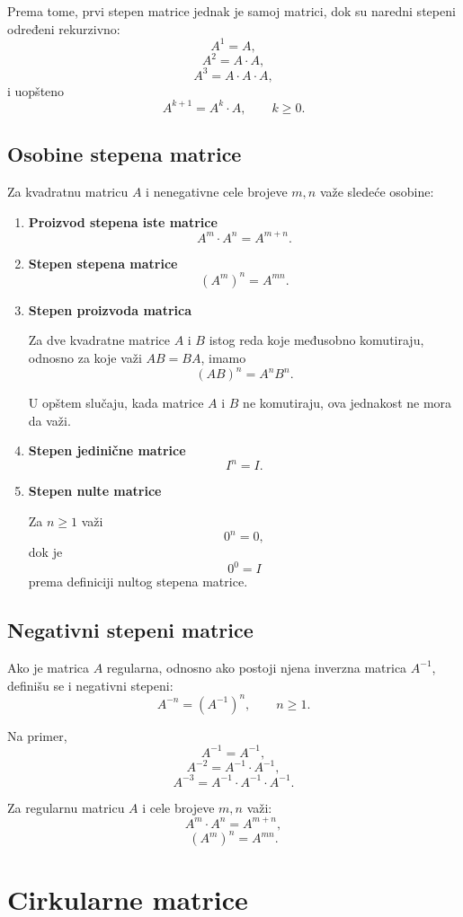 \documentclass[12pt,a4paper]{report}
\begin{document}
Prema tome, prvi stepen matrice jednak je samoj matrici,
dok su naredni stepeni određeni rekurzivno:
\[
A^1=A,
\]
\[
A^2=A\cdot A,
\]
\[
A^3=A\cdot A\cdot A,
\]
i uopšteno
\[
A^{k+1}=A^k\cdot A,\qquad k\geq 0.
\]

\subsection{Osobine stepena matrice}

Za kvadratnu matricu $A$ i nenegativne cele brojeve $m,n$
važe sledeće osobine:

\begin{enumerate}
	\item \textbf{Proizvod stepena iste matrice}
	\[
	A^m\cdot A^n=A^{m+n}.
	\]
	
	\item \textbf{Stepen stepena matrice}
	\[
	(A^m)^n=A^{mn}.
	\]
	
	\item \textbf{Stepen proizvoda matrica}
	
	Za dve kvadratne matrice $A$ i $B$ istog reda koje
	međusobno komutiraju, odnosno za koje važi $AB=BA$,
	imamo
	\[
	(AB)^n=A^nB^n.
	\]
	
	U opštem slučaju, kada matrice $A$ i $B$ ne komutiraju,
	ova jednakost ne mora da važi.
	
	\item \textbf{Stepen jedinične matrice}
	\[
	I^n=I.
	\]
	
	\item \textbf{Stepen nulte matrice}
	
	Za $n\geq 1$ važi
	\[
	0^n=0,
	\]
	dok je
	\[
	0^0=I
	\]
	prema definiciji nultog stepena matrice.
\end{enumerate}

\subsection{Negativni stepeni matrice}

Ako je matrica $A$ regularna, odnosno ako postoji njena
inverzna matrica $A^{-1}$, definišu se i negativni stepeni:
\[
A^{-n}=(A^{-1})^n,\qquad n\geq 1.
\]

Na primer,
\[
A^{-1}=A^{-1},
\]
\[
A^{-2}=A^{-1}\cdot A^{-1},
\]
\[
A^{-3}=A^{-1}\cdot A^{-1}\cdot A^{-1}.
\]

Za regularnu matricu $A$ i cele brojeve $m,n$ važi:
\[
A^m\cdot A^n=A^{m+n},
\]
\[
(A^m)^n=A^{mn}.
\]

\section{Cirkularne matrice}
\end{document}
